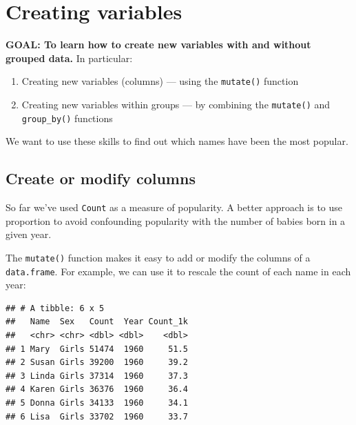 \documentclass[
]{book}
\newenvironment{Shaded}{\begin{snugshade}}{\end{snugshade}}
\newcommand{\DataTypeTok}[1]{\textcolor[rgb]{0.13,0.29,0.53}{#1}}
\newcommand{\DecValTok}[1]{\textcolor[rgb]{0.00,0.00,0.81}{#1}}
\newcommand{\KeywordTok}[1]{\textcolor[rgb]{0.13,0.29,0.53}{\textbf{#1}}}
\newcommand{\NormalTok}[1]{#1}
\newcommand{\OperatorTok}[1]{\textcolor[rgb]{0.81,0.36,0.00}{\textbf{#1}}}
\newcommand{\StringTok}[1]{\textcolor[rgb]{0.31,0.60,0.02}{#1}}
\providecommand{\tightlist}{%
  \setlength{\itemsep}{0pt}\setlength{\parskip}{0pt}}
\begin{document}
\hypertarget{creating-variables}{%
\section{Creating variables}\label{creating-variables}}

\textbf{GOAL: To learn how to create new variables with and without grouped data.} In particular:

\begin{enumerate}
\def\labelenumi{\arabic{enumi}.}
\tightlist
\item
  Creating new variables (columns) --- using the \texttt{mutate()} function
\item
  Creating new variables within groups --- by combining the \texttt{mutate()} and \texttt{group\_by()} functions
\end{enumerate}

We want to use these skills to find out which names have been the most popular.

\hypertarget{create-or-modify-columns}{%
\subsection{Create or modify columns}\label{create-or-modify-columns}}

So far we've used \texttt{Count} as a measure of popularity. A better
approach is to use proportion to avoid confounding
popularity with the number of babies born in a given year.

The \texttt{mutate()} function makes it easy to add or modify the columns
of a \texttt{data.frame}. For example, we can use it to rescale the count
of each name in each year:

\begin{Shaded}
\end{Shaded}

\begin{verbatim}
## # A tibble: 6 x 5
##   Name  Sex   Count  Year Count_1k
##   <chr> <chr> <dbl> <dbl>    <dbl>
## 1 Mary  Girls 51474  1960     51.5
## 2 Susan Girls 39200  1960     39.2
## 3 Linda Girls 37314  1960     37.3
## 4 Karen Girls 36376  1960     36.4
## 5 Donna Girls 34133  1960     34.1
## 6 Lisa  Girls 33702  1960     33.7
\end{verbatim}
\end{document}
